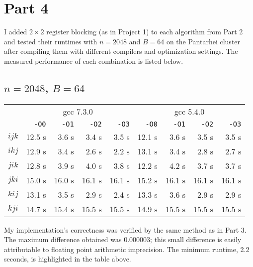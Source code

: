 \documentclass[12pt,letterpaper,oneside]{article}
\begin{document}
\newpage
\section*{Part 4}
I added $2\times2$ register blocking (as in Project 1) to each algorithm from Part 2 and tested their runtimes with $n=2048$ and $B=64$ on the Pantarhei cluster after compiling them with different compilers and optimization settings. The measured performance of each combination is listed below.
\begin{center}
	\subsection*{$n=2048$, $B=64$}
	\begin{tabular}{c | r r r r | r r r r}
		& \multicolumn{4}{c|}{gcc 7.3.0} & \multicolumn{4}{c}{gcc 5.4.0} \\
		& \texttt{-O0} & \texttt{-O1} & \texttt{-O2} & \texttt{-O3} & \texttt{-O0} & \texttt{-O1} & \texttt{-O2} & \texttt{-O3} \\
		\hline
		$ijk$ & 12.5 s & 3.6 s & 3.4 s & 3.5 s & 12.1 s & 3.6 s & 3.5 s & 3.5 s \\
		$ikj$ & 12.9 s & 3.4 s & 2.6 s & \cellcolor{yellow!50} 2.2 s & 13.1 s & 3.4 s & 2.8 s & 2.7 s \\
		$jik$ & 12.8 s & 3.9 s & 4.0 s & 3.8 s & 12.2 s & 4.2 s & 3.7 s & 3.7 s \\ 
		$jki$ & 15.0 s & 16.0 s & 16.1 s & 16.1 s & 15.2 s & 16.1 s & 16.1 s & 16.1 s \\
		$kij$ & 13.1 s & 3.5 s & 2.9 s & 2.4 s & 13.3 s & 3.6 s & 2.9 s & 2.9 s \\
		$kji$ & 14.7 s & 15.4 s & 15.5 s & 15.5 s & 14.9 s & 15.5 s & 15.5 s & 15.5 s
	\end{tabular}
\end{center}

My implementation's correctness was verified by the same method as in Part 3. The maximum difference obtained was 0.000003; this small difference is easily attributable to floating point arithmetic imprecision.
The minimum runtime, 2.2 seconds, is highlighted in the table above.
\end{document}
